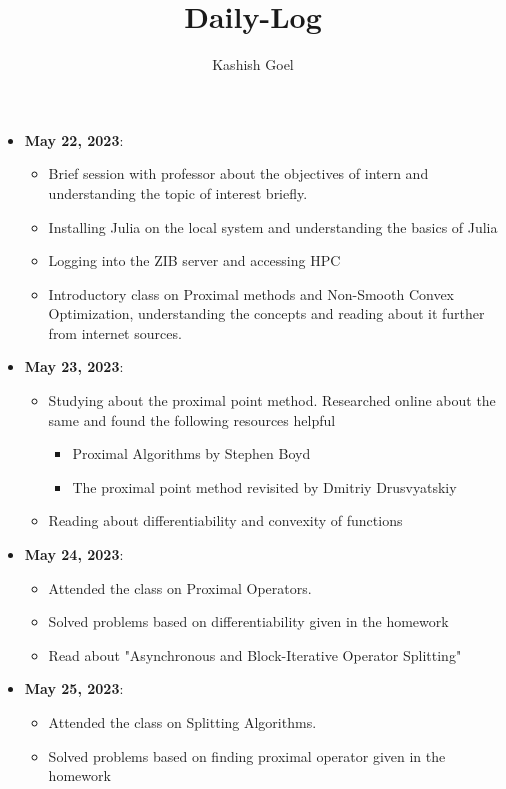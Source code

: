 \documentclass[a4paper,11pt,fleqn]{article}
\theoremstyle{plain}{\theorembodyfont{\rmfamily}%
\newtheorem{conjecture}[theorem]{Conjecture}}
\theoremstyle{plain}{\theorembodyfont{\rmfamily}%
\newtheorem{example}[theorem]{Example}}
\theoremstyle{plain}{\theorembodyfont{\rmfamily}%
\newtheorem{remark}[theorem]{Remark}}
\theoremstyle{plain}{\theorembodyfont{\rmfamily}%
\newtheorem{algorithm}[theorem]{Algorithm}}
\theoremstyle{plain}{\theorembodyfont{\rmfamily}%
\newtheorem{condition}[theorem]{Condition}}
\theoremstyle{plain}{\theorembodyfont{\rmfamily}%
\newtheorem{definition}[theorem]{Definition}}
\theoremstyle{plain}{\theorembodyfont{\rmfamily}
\newtheorem{fact}[theorem]{Fact}}
\theoremstyle{plain}{\theorembodyfont{\rmfamily}
\newtheorem{problem}[theorem]{Problem}}
\theoremstyle{plain}{\theorembodyfont{\rmfamily}
\newtheorem{notation}[theorem]{Notation}}
\theoremstyle{plain}{\theorembodyfont{\rmfamily}
\newtheorem{project}[theorem]{Project}}
\begin{document}
\title{Daily-Log}
\author{Kashish Goel}
\date{}
\maketitle 
\begin{itemize}
\item
{\bf May 22, 2023}: 
\begin{itemize}
    \item Brief session with professor about the objectives of intern and understanding the topic of interest briefly.
    \item Installing Julia on the local system and understanding the basics of Julia
    \item Logging into the ZIB server and accessing HPC
    \item Introductory class on Proximal methods and Non-Smooth Convex Optimization, understanding the concepts and reading about it further from internet sources.
\end{itemize}
\item 
{\bf May 23, 2023}:
\begin{itemize}
    \item Studying about the proximal point method. Researched online about the same and found the following resources helpful
    \begin{itemize}
        \item Proximal Algorithms by Stephen Boyd
        \item The proximal point method revisited by Dmitriy Drusvyatskiy
    \end{itemize}
    \item Reading about differentiability and convexity of functions
\end{itemize}
\item 
{\bf May 24, 2023}:
\begin{itemize}
    \item Attended the class on Proximal Operators.
    \item Solved problems based on differentiability given in the homework
    \item Read about "Asynchronous and Block-Iterative Operator Splitting" 
\end{itemize}
\item 
{\bf May 25, 2023}:
\begin{itemize}
    \item Attended the class on Splitting Algorithms.
    \item Solved problems based on finding proximal operator given in the homework

\end{itemize}
\end{itemize}
\end{document}
